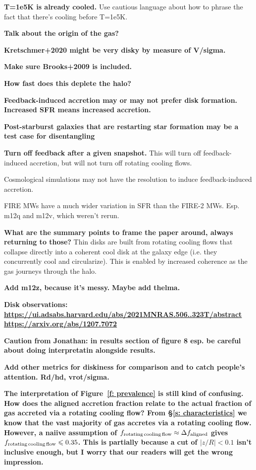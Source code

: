 \documentclass[fleqn,usenatbib]{mnras}
\begin{document}
\textbf{T=1e5K is already cooled.}
Use cautious language about how to phrase the fact that there's cooling before T=1e5K.

\textbf{Talk about the origin of the gas?}

\textbf{Kretschmer+2020 might be very disky by measure of V/sigma.}

\textbf{Make sure Brooks+2009 is included.}

\textbf{How fast does this deplete the halo?}

\textbf{
Feedback-induced accretion may or may not prefer disk formation.
Increased SFR means increased accretion.
}

\textbf{
Post-starburst galaxies that are restarting star formation may be a test case for disentangling 
}

\textbf{Turn off feedback after a given snapshot.}
This will turn off feedback-induced accretion, but will not turn off rotating cooling flows.

Cosmological simulations may not have the resolution to induce feedback-induced accretion.

FIRE MWs have a much wider variation in SFR than the FIRE-2 MWs.
Esp. m12q and m12v, which weren't rerun.

\textbf{What are the summary points to frame the paper around, always returning to those?}
Thin disks are built from rotating cooling flows that collapse directly into a coherent cool disk at the galaxy edge (i.e. they concurrently cool and circularize).
This is enabled by increased coherence as the gas journeys through the halo.

\textbf{Add m12z, because it's messy.}
\textbf{Maybe add thelma.}

\textbf{Disk observations:
\url{https://ui.adsabs.harvard.edu/abs/2021MNRAS.506..323T/abstract}
\url{https://arxiv.org/abs/1207.7072}
}

\textbf{
Caution from Jonathan: in results section of figure 8 esp. be careful about doing interpretatin alongside results.
}

\textbf{Add other metrics for diskiness for comparison and to catch people's attention.
Rd/hd, vrot/sigma.
}

\textbf{
The interpretation of Figure~\ref{f: prevalence} is still kind of confusing.
How does the aligned accretion fraction relate to the actual fraction of gas accreted via a rotating cooling flow?
From \S\ref{s: characteristics} we know that the vast majority of gas accretes via a rotating cooling flow.
However, a naiive assumption of $f_{\rm rotating\,cooling\,flow} \approx \Delta f_{\rm aligned}$ gives $f_{\rm rotating\,cooling\,flow} \le 0.35$.
This is partially because a cut of $\vert z/R\vert < 0.1$ isn't inclusive enough, but I worry that our readers will get the wrong impression.
}
\end{document}
